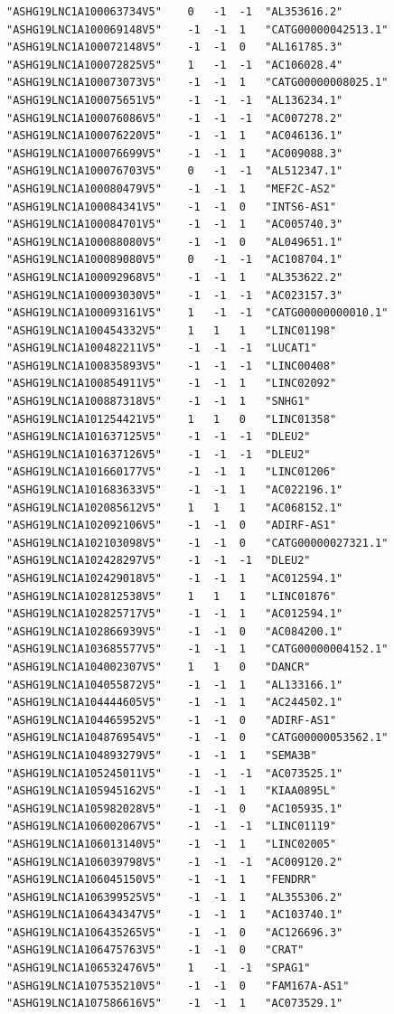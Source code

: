 \documentclass[en,black,12pt,normal]{elegantnote}
\begin{document}
\begin{lstlisting}
"ASHG19LNC1A100063734V5"	0	-1	-1	"AL353616.2"
"ASHG19LNC1A100069148V5"	-1	-1	1	"CATG00000042513.1"
"ASHG19LNC1A100072148V5"	-1	-1	0	"AL161785.3"
"ASHG19LNC1A100072825V5"	1	-1	-1	"AC106028.4"
"ASHG19LNC1A100073073V5"	-1	-1	1	"CATG00000008025.1"
"ASHG19LNC1A100075651V5"	-1	-1	-1	"AL136234.1"
"ASHG19LNC1A100076086V5"	-1	-1	-1	"AC007278.2"
"ASHG19LNC1A100076220V5"	-1	-1	1	"AC046136.1"
"ASHG19LNC1A100076699V5"	-1	-1	1	"AC009088.3"
"ASHG19LNC1A100076703V5"	0	-1	-1	"AL512347.1"
"ASHG19LNC1A100080479V5"	-1	-1	1	"MEF2C-AS2"
"ASHG19LNC1A100084341V5"	-1	-1	0	"INTS6-AS1"
"ASHG19LNC1A100084701V5"	-1	-1	1	"AC005740.3"
"ASHG19LNC1A100088080V5"	-1	-1	0	"AL049651.1"
"ASHG19LNC1A100089080V5"	0	-1	-1	"AC108704.1"
"ASHG19LNC1A100092968V5"	-1	-1	1	"AL353622.2"
"ASHG19LNC1A100093030V5"	-1	-1	-1	"AC023157.3"
"ASHG19LNC1A100093161V5"	1	-1	-1	"CATG00000000010.1"
"ASHG19LNC1A100454332V5"	1	1	1	"LINC01198"
"ASHG19LNC1A100482211V5"	-1	-1	-1	"LUCAT1"
"ASHG19LNC1A100835893V5"	-1	-1	-1	"LINC00408"
"ASHG19LNC1A100854911V5"	-1	-1	1	"LINC02092"
"ASHG19LNC1A100887318V5"	-1	-1	1	"SNHG1"
"ASHG19LNC1A101254421V5"	1	1	0	"LINC01358"
"ASHG19LNC1A101637125V5"	-1	-1	-1	"DLEU2"
"ASHG19LNC1A101637126V5"	-1	-1	-1	"DLEU2"
"ASHG19LNC1A101660177V5"	-1	-1	1	"LINC01206"
"ASHG19LNC1A101683633V5"	-1	-1	1	"AC022196.1"
"ASHG19LNC1A102085612V5"	1	1	1	"AC068152.1"
"ASHG19LNC1A102092106V5"	-1	-1	0	"ADIRF-AS1"
"ASHG19LNC1A102103098V5"	-1	-1	0	"CATG00000027321.1"
"ASHG19LNC1A102428297V5"	-1	-1	-1	"DLEU2"
"ASHG19LNC1A102429018V5"	-1	-1	1	"AC012594.1"
"ASHG19LNC1A102812538V5"	1	1	1	"LINC01876"
"ASHG19LNC1A102825717V5"	-1	-1	1	"AC012594.1"
"ASHG19LNC1A102866939V5"	-1	-1	0	"AC084200.1"
"ASHG19LNC1A103685577V5"	-1	-1	1	"CATG00000004152.1"
"ASHG19LNC1A104002307V5"	1	1	0	"DANCR"
"ASHG19LNC1A104055872V5"	-1	-1	1	"AL133166.1"
"ASHG19LNC1A104444605V5"	-1	-1	1	"AC244502.1"
"ASHG19LNC1A104465952V5"	-1	-1	0	"ADIRF-AS1"
"ASHG19LNC1A104876954V5"	-1	-1	0	"CATG00000053562.1"
"ASHG19LNC1A104893279V5"	-1	-1	1	"SEMA3B"
"ASHG19LNC1A105245011V5"	-1	-1	-1	"AC073525.1"
"ASHG19LNC1A105945162V5"	-1	-1	1	"KIAA0895L"
"ASHG19LNC1A105982028V5"	-1	-1	0	"AC105935.1"
"ASHG19LNC1A106002067V5"	-1	-1	-1	"LINC01119"
"ASHG19LNC1A106013140V5"	-1	-1	1	"LINC02005"
"ASHG19LNC1A106039798V5"	-1	-1	-1	"AC009120.2"
"ASHG19LNC1A106045150V5"	-1	-1	1	"FENDRR"
"ASHG19LNC1A106399525V5"	-1	-1	1	"AL355306.2"
"ASHG19LNC1A106434347V5"	-1	-1	1	"AC103740.1"
"ASHG19LNC1A106435265V5"	-1	-1	0	"AC126696.3"
"ASHG19LNC1A106475763V5"	-1	-1	0	"CRAT"
"ASHG19LNC1A106532476V5"	1	-1	-1	"SPAG1"
"ASHG19LNC1A107535210V5"	-1	-1	0	"FAM167A-AS1"
"ASHG19LNC1A107586616V5"	-1	-1	1	"AC073529.1"

\end{lstlisting}
\end{document}
